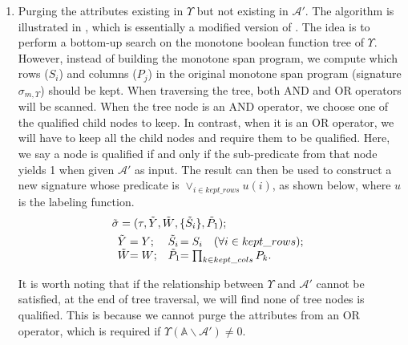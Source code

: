 \begin{enumerate}
  \item Purging the attributes existing in $\Upsilon$ but not existing in $\mathcal{A}'$.
    The algorithm is illustrated in , which is essentially a modified version of .
    The idea is to perform a bottom-up search on the monotone boolean function tree of $\Upsilon$. However, instead of building the monotone span program, we compute which rows ($S_i$) and columns ($P_j$) in the original monotone span program (signature $\sigma_{m, \Upsilon}$) should be kept. When traversing the tree, both AND and OR operators will be scanned. When the tree node is an AND operator, we choose one of the qualified child nodes to keep. In contrast, when it is an OR operator, we will have to keep all the child nodes and require them to be qualified. Here, we say a node is qualified if and only if the sub-predicate from that node yields 1 when given $\mathcal{A}'$ as input. The result can then be used to construct a new signature whose predicate is $\lor_{i \in kept\_rows} u(i)$, as shown below, where $u$ is the labeling function.
    \begin{align*}
              & \tilde{\sigma} = (\tau, \tilde{Y},\tilde{W},\{\tilde{S}_i\}, \tilde{P}_1); \\
              &\begin{array}{l@{}ll@{}l}
                \tilde{Y} & = Y; &
                \tilde{S}_i & = S_i \quad (\forall i \in kept\_rows);
                \\
                \tilde{W} & = W; &
                \tilde{P}_1 & = \prod_{k \in kept\_cols}{P_k}.
              \end{array}
    \end{align*}

    It is worth noting that if the relationship between $\Upsilon$ and $\mathcal{A}'$ cannot be satisfied, at the end of tree traversal, we will find none of tree nodes is qualified. This is because we cannot purge the attributes from an OR operator, which is required if $\Upsilon(\mathbb{A}\backslash\mathcal{A}') \neq 0$.


\end{enumerate}

